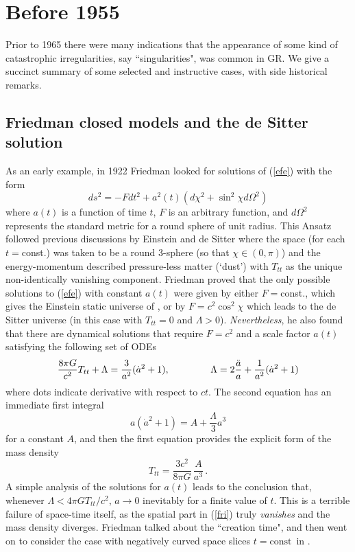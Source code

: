 \documentclass[12pt]{iopart}
\def\be{\begin{equation}}
\def\ee{\end{equation}}
\begin{document}
\section{Before 1955}\label{sec:prehistory}
Prior to 1965 there were many indications that the appearance of some kind of catastrophic  irregularities, say  ``singularities", was common in GR. We give a succinct summary of some selected and instructive cases, with side historical remarks.
\subsection{Friedman closed models and the de Sitter solution}
As an early example, in 1922 Friedman \cite{Fri} looked for solutions of (\ref{efe}) with the form
\be
ds^2 = -F dt^2 + a^2(t)\left(d\chi^2+\sin^2 \chi d\Omega^2\right) \label{fri}
\ee
where $a(t)$ is a function of time $t$, $F$ is an arbitrary function, and $d\Omega^2$ represents the standard metric for a round sphere of unit radius. This Ansatz followed previous discussions by Einstein and de Sitter \cite{E0,dS} where the space (for each $t=$const.) was taken to be a round 3-sphere (so that $\chi\in (0,\pi)$) and the energy-momentum described pressure-less matter (`dust') with $T_{tt}$ as the unique non-identically vanishing component. Friedman proved that the only possible solutions to (\ref{efe}) with constant $a(t)$ were given by either $F=$const., which gives the Einstein static universe of \cite{E0}, or by $F=c^2 \cos^2\chi$ which leads to the de Sitter universe \cite{dS,dS1} (in this case with $T_{tt}=0$ and $\Lambda >0$). {\it Nevertheless}, he also found that there are dynamical solutions that require $F=c^2$ and a scale factor $a(t)$ satisfying the following set of ODEs
$$
\frac{8\pi G}{c^2}T_{tt} +\Lambda 
=\frac{3}{a^2}(\dot{a}^2+1),\hspace{15mm} 
\Lambda=2\frac{\ddot a}{a}+\frac{1}{a^2}(\dot{a}^2+1)
$$
where dots indicate derivative with respect to $ct$. The second equation has an immediate first integral
$$
a(\dot{a}^2+1)=A+\frac{\Lambda}{3}a^3
$$
for a constant $A$, and then the first equation provides the explicit form of the mass density 
$$
T_{tt} =\frac{3c^2}{8\pi G}\, \frac{A}{a^3}\, .
$$
A simple analysis of the solutions for $a(t)$ leads to the conclusion that, whenever 
$\Lambda <4\pi GT_{tt}/c^2$, $a\rightarrow 0$ inevitably for a finite value of $t$. This is a terrible failure of space-time itself, as the spatial part in (\ref{fri}) truly {\it vanishes} and the mass density diverges. Friedman talked about the ``creation time", and then went on to consider the case with negatively curved space slices $t=\mathrm{const}$\ in \cite{Fri2}.
\end{document}
